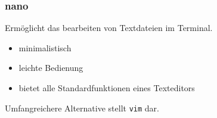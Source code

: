\documentclass[12pt,utf8]{beamer}
\begin{document}
\begin{frame}
	\frametitle{nano}
	Ermöglicht das bearbeiten von Textdateien im Terminal.
	\begin{itemize}
		\item minimalistisch
		\item leichte Bedienung
		\item bietet alle Standardfunktionen eines Texteditors
	\end{itemize}
	Umfangreichere Alternative stellt \texttt{vim} dar.
\end{frame}

%
\end{document}
